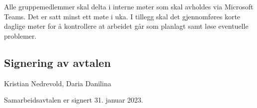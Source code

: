 Alle gruppemedlemmer skal delta i interne møter som skal avholdes via Microsoft Teams. Det er satt minst ett møte i uka. I tillegg skal det gjennomføres korte daglige møter for å kontrollere at arbeidet går som planlagt samt løse eventuelle problemer.

\subsection{Signering av avtalen}

Kristian Nedrevold, Daria Danilina

Samarbeidsavtalen er signert 31. januar 2023.  